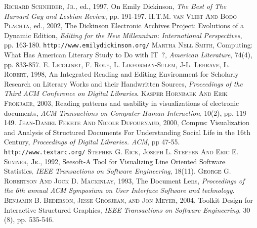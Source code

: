 \documentclass[10pt, twocolumn]{article}
\begin{document}
\begin{thebibliography}{10}
 \textsc{Richard Schneider, Jr.}, ed., 1997, On Emily Dickinson, \textsl{The Best of The Harvard Gay and Lesbian Review},  pp. 191-197. 
 \textsc{H.T.M. van Vliet And Bodo Plachta}, ed., 2002, The Dickinson Electronic Archives Project: Evolutions of a Dynamic Edition, \textsl{Editing for the New Millennium: International Perspectives}, pp. 163-180. 
 \texttt{http://www.emilydickinson.org/}
 \textsc{Martha Nell Smith}, Computing: What Has American Literary Study to Do with IT~?, \textsl{American Literature}, 74(4), pp. 833-857.
 \textsc{E. Licolinet, F. Role, L. Likforman-Sulem, J-L. Lebrave, L. Robert}, 1998, An Integrated Reading and Editing Environment for Scholarly Research on Literary Works and their Handwritten Sources, \textsl{Proceedings of the Third ACM Conference on Digital Libraries}.
 \textsc{Kasper Hornbaek And Erik Frokjaer}, 2003, Reading patterns and usability in visualizations of electronic documents, \textsl{ACM Transactions on Computer-Human Interaction}, 10(2), pp. 119-149. 
 \textsc{Jean-Daniel Fekete And Nicole Dufournaud}, 2000, Compus: Visualization and Analysis of Structured Documents For Understanding Social Life in the 16th Century, \textsl{Proceedings of Digital Libraries. ACM},  pp 47-55.
 \texttt{http://www.textarc.org/}
 \textsc{Stephen G. Eick, Joseph L. Steffen And Eric E. Sumner, Jr.}, 1992, Seesoft-A Tool for Visualizing Line Oriented Software Statistics, \textsl{IEEE Transactions on Software Engineering}, 18(11).
 \textsc{George G. Robertson And Jock D. Mackinlay}, 1993, The Document Lens, \textsl{Proceedings of the 6th annual ACM Symposium on User Interface Software and technology}.
 \textsc{Benjamin B. Bederson, Jesse Grosjean, and Jon Meyer}, 2004, Toolkit Design for Interactive Structured Graphics, \textsl{IEEE Transactions on Software Engineering}, 30 (8), pp. 535-546. 
\end{thebibliography}
\end{document}
